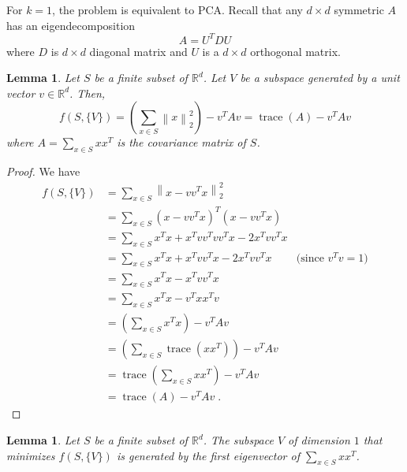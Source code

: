 \documentclass[12pt]{article}
\newtheorem{lemma}[theorem]{Lemma}
\newcommand{\R}{\mathbb{R}}
\newcommand{\norm}[1]{\left\|#1\right\|}
\DeclareMathOperator*{\trace}{trace}
\begin{document}
For $k=1$, the problem is equivalent to PCA. Recall that any $d \times d$
symmetric $A$ has an eigendecomposition
$$
A = U^T D U
$$
where $D$ is $d \times d$ diagonal matrix and $U$ is a $d \times d$
orthogonal matrix.

\begin{lemma}
Let $S$ be a finite subset of $\R^d$. Let $V$ be a subspace
generated by a unit vector $v \in \R^d$. Then,
$$
f(S,\{V\})
= \left(\sum_{x \in S} \norm{x}_2^2 \right) - v^T A v
= \trace(A) - v^T A v
$$
where $A = \sum_{x \in S} xx^T$ is the covariance matrix of $S$.
\end{lemma}

\begin{proof}
We have
\begin{align*}
f(S, \{V\})
& = \sum_{x \in S} \norm{x - vv^T x}_2^2 \\
& = \sum_{x \in S} (x - vv^T x)^T (x - vv^Tx) \\
& = \sum_{x \in S} x^Tx + x^T vv^T vv^T x - 2 x^T vv^T x  \\
& = \sum_{x \in S} x^Tx + x^T vv^T x - 2 x^T vv^T x & \text{(since $v^Tv = 1$)} \\
& = \sum_{x \in S} x^Tx - x^T vv^T x  \\
& = \sum_{x \in S} x^Tx - v^T xx^T v  \\
& = \left(\sum_{x \in S} x^Tx \right) - v^T A v  \\
& = \left(\sum_{x \in S} \trace(xx^T) \right) - v^T A v \\
& = \trace \left(\sum_{x \in S} xx^T \right) - v^T A v \\
& = \trace(A) - v^T A v \; .
\end{align*}
\end{proof}

\begin{lemma}
Let $S$ be a finite subset of $\R^d$.
The subspace $V$ of dimension $1$ that minimizes $f(S, \{V\})$ is generated
by the first eigenvector of $\sum_{x \in S} xx^T$.
\end{lemma}
\end{document}
